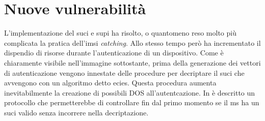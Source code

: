 \section{Nuove vulnerabilità}
L'implementazione del \gls{suci} e \gls{supi} ha risolto, o quantomeno reso molto più complicata la pratica dell'\gls{imsi} \textit{catching}. Allo stesso tempo però ha incrementato il dispendio di risorse durante l'autenticazione
di un dispositivo. Come è chiaramente visibile nell'immagine sottostante, prima della generazione dei vettori di autenticazione vengono innestate delle procedure per decriptare il \gls{suci} che avvengono con un algoritmo detto 
\gls{ecies}. 
Questa procedura aumenta inevitabilmente la creazione di possibili DOS all'autentcazione. 
In \cite{5g-lightweight} è descritto un protocollo che permetterebbe di controllare fin dal primo momento se il \gls{ms} ha un \gls{suci} valido senza incorrere nella decriptazione.
